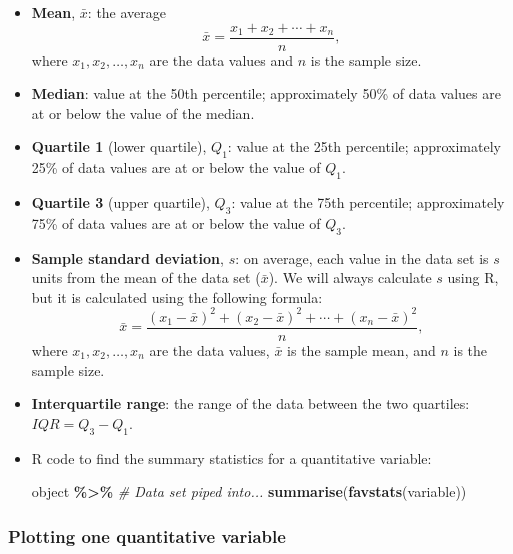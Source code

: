 \documentclass[
]{report}
\newenvironment{Shaded}{\begin{snugshade}}{\end{snugshade}}
\newcommand{\CommentTok}[1]{\textcolor[rgb]{0.56,0.35,0.01}{\textit{#1}}}
\newcommand{\FunctionTok}[1]{\textcolor[rgb]{0.13,0.29,0.53}{\textbf{#1}}}
\newcommand{\NormalTok}[1]{#1}
\newcommand{\SpecialCharTok}[1]{\textcolor[rgb]{0.81,0.36,0.00}{\textbf{#1}}}
\begin{document}
\begin{itemize}
\item
  \textbf{Mean}, \(\bar{x}\): the average
  \[ 
  \bar{x} = \frac{x_1 + x_2 + \cdots + x_n}{n},
  \]
  where \(x_1, x_2, \ldots, x_n\) are the data values and \(n\) is the sample size.
\item
  \textbf{Median}: value at the 50th percentile; approximately 50\% of data values are at or below the value of the median.
\item
  \textbf{Quartile 1} (lower quartile), \(Q_1\): value at the 25th percentile; approximately 25\% of data values are at or below the value of \(Q_1\).
\item
  \textbf{Quartile 3} (upper quartile), \(Q_3\): value at the 75th percentile; approximately 75\% of data values are at or below the value of \(Q_3\).
\item
  \textbf{Sample standard deviation}, \(s\): on average, each value in the data set is \(s\) units from the mean of the data set (\(\bar{x}\)). We will always calculate \(s\) using R, but it is calculated using the following formula:
  \[
  \bar{x} = \frac{(x_1-\bar{x})^2 + (x_2-\bar{x})^2 + \cdots + (x_n-\bar{x})^2}{n},
  \]
  where \(x_1, x_2, \ldots, x_n\) are the data values, \(\bar{x}\) is the sample mean, and \(n\) is the sample size.
\item
  \textbf{Interquartile range}: the range of the data between the two quartiles: \(IQR = Q_3-Q_1\).
\item
  R code to find the summary statistics for a quantitative variable:

\begin{Shaded}
\begin{Highlighting}[]
\NormalTok{object }\SpecialCharTok{\%\textgreater{}\%} \CommentTok{\# Data set piped into...}
    \FunctionTok{summarise}\NormalTok{(}\FunctionTok{favstats}\NormalTok{(variable))}
\end{Highlighting}
\end{Shaded}
\end{itemize}

\subsubsection*{Plotting one quantitative variable}\label{plotting-one-quantitative-variable}
\end{document}
